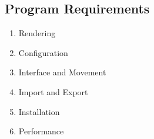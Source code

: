 \subsection{Program Requirements}

\begin{enumerate}
    \item Rendering
    \item Configuration
    \item Interface and Movement
    \item Import and Export
    \item Installation
    \item Performance
\end{enumerate}


\newcommand{\highPriority}[0]{{\color{red} \textbf{HIGH}}}
\newcommand{\mediumPriority}[0]{{\color{orange} \textbf{MEDIUM}}}
\newcommand{\lowPriority}[0]{{\color{yellow} \textbf{LOW}}}
\newcommand{\veryLowPriority}[0]{{\color{green} \textbf{VERY LOW}}}
\newcommand{\possibleFeature}[0]{{\color{purple} \textbf{POSSIBILTIY}}}

